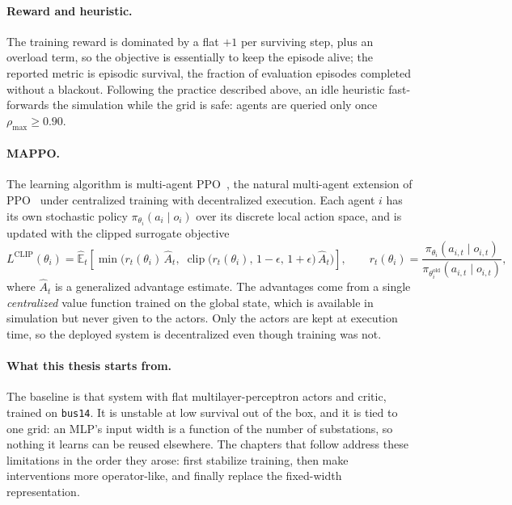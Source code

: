 \paragraph{Reward and heuristic.}
The training reward is dominated by a flat $+1$ per surviving step, plus an
overload term, so the objective is essentially to keep the episode alive; the
reported metric is episodic survival, the fraction of evaluation episodes
completed without a blackout. Following the practice described above, an idle
heuristic fast-forwards the simulation while the grid is safe: agents are
queried only once $\rho_{\max} \geq 0.90$.

\paragraph{MAPPO.}
The learning algorithm is multi-agent PPO~\cite{yu2022mappo}, the natural
multi-agent extension of PPO~\cite{schulman2017ppo} under centralized training
with decentralized execution. Each agent $i$ has its own stochastic policy
$\pi_{\theta_i}(a_i \mid o_i)$ over its discrete local action space, and is
updated with the clipped surrogate objective
\[
  L^{\text{CLIP}}(\theta_i)
  = \hat{\mathbb{E}}_t\!\left[
      \min\!\Big(
        r_t(\theta_i)\,\hat{A}_t,\;
        \operatorname{clip}\big(r_t(\theta_i),\,1-\epsilon,\,1+\epsilon\big)\,
        \hat{A}_t
      \Big)
    \right],
  \qquad
  r_t(\theta_i)
  = \frac{\pi_{\theta_i}(a_{i,t} \mid o_{i,t})}
         {\pi_{\theta_i^{\text{old}}}(a_{i,t} \mid o_{i,t})},
\]
where $\hat{A}_t$ is a generalized advantage estimate. The advantages come from
a single \emph{centralized} value function trained on the global state, which is
available in simulation but never given to the actors. Only the actors are kept
at execution time, so the deployed system is decentralized even though training
was not.

\paragraph{What this thesis starts from.}
The baseline is that system with flat multilayer-perceptron actors and critic,
trained on \texttt{bus14}. It is unstable at low survival out of the box, and it
is tied to one grid: an MLP's input width is a function of the number of
substations, so nothing it learns can be reused elsewhere. The chapters that
follow address these limitations in the order they arose: first stabilize
training, then make interventions more operator-like, and finally replace the
fixed-width representation.

